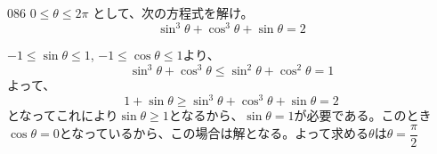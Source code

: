 \begin{prob}{086}{}{}
 $0 \le \theta \le 2\pi$ として、次の方程式を解け。 \\
 \[ \sin^3\theta+\cos^3\theta+\sin\theta=2 \]
\end{prob}
$-1\le\sin\theta\le 1$, $-1\le\cos\theta\le 1$より、
\[ \sin^3\theta+\cos^3\theta\le\sin^2\theta+\cos^2\theta=1 \]
よって、
\[ 1+\sin\theta \ge \sin^3\theta+\cos^3\theta+\sin\theta=2 \]
となってこれにより$\sin\theta\ge 1$となるから、$\sin\theta=1$が必要である。このとき$\cos\theta=0$となっているから、この場合は解となる。よって求める$\theta$は$\theta=\dfrac{\pi}{2}$